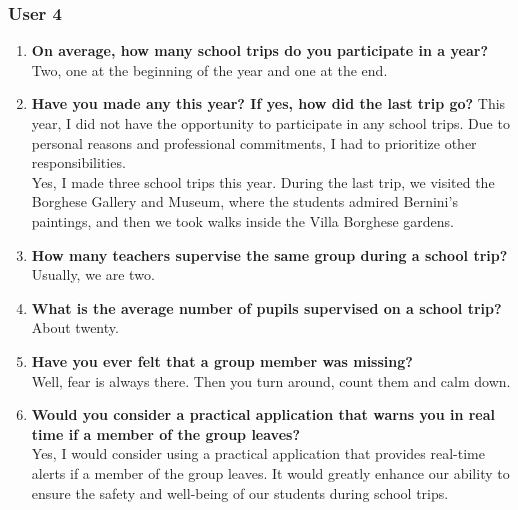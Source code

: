 \subsubsection*{User 4}
\begin{enumerate}
\item \textbf{On average, how many school trips do you participate in a year?}
\\ Two, one at the beginning of the year and one at the end.
\item \textbf{Have you made any this year? If yes, how did the last trip go?}
This year, I did not have the opportunity to participate in any school trips. Due to personal reasons and professional commitments, I had to prioritize other responsibilities. 
\\ Yes, I made three school trips this year. During the last trip, we visited the Borghese Gallery and Museum, where the students admired Bernini's paintings, and then we took walks inside the Villa Borghese gardens.
\item \textbf{How many teachers supervise the same group during a school trip?}
\\ Usually, we are two.
\item \textbf{What is the average number of pupils supervised on a school trip?}
\\ About twenty.
\item \textbf{Have you ever felt that a group member was missing?}
\\ Well, fear is always there. Then you turn around, count them and calm down.
\item \textbf{Would you consider a practical application that warns you in real time if a member of the group leaves?}
\\ Yes, I would consider using a practical application that provides real-time alerts if a member of the group leaves. It would greatly enhance our ability to ensure the safety and well-being of our students during school trips.
\end{enumerate}


